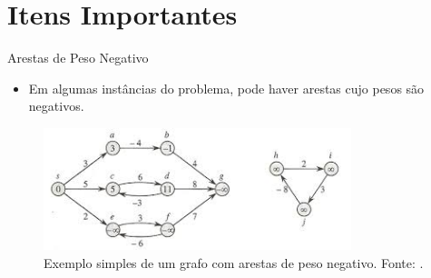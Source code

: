 \documentclass{beamer}
\begin{document}
\section{Itens Importantes}
	\begin{frame}{Arestas de Peso Negativo}
		\begin{itemize}
			\item Em algumas instâncias do problema, pode haver arestas cujo pesos são negativos. 
		\end{itemize}
		
			\begin{figure}[H]
				\centering
				\includegraphics[width=0.8\textwidth]{img/negativo2.jpeg}
				\caption{Exemplo simples de um grafo com arestas de peso negativo. Fonte: \cite{cormen2002algoritmos}.}
				\label{fig:negativo1}
			\end{figure}
	\end{frame}
	
\end{document}
